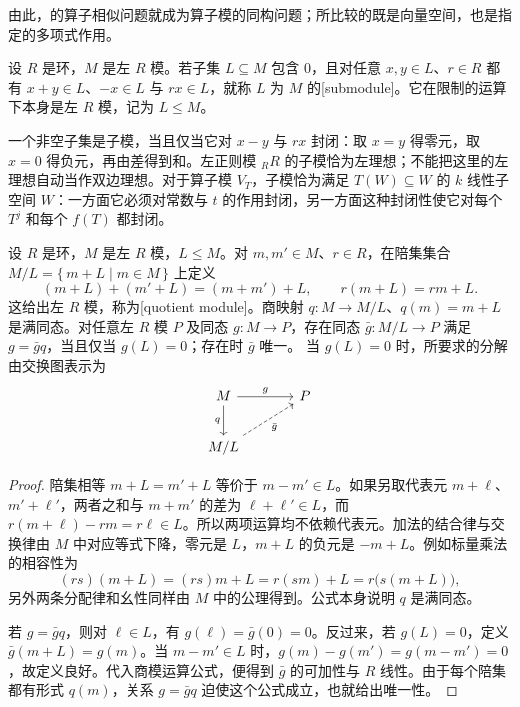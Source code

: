 由此，的算子相似问题就成为算子模的同构问题；所比较的既是向量空间，也是指定的多项式作用。

\begin{definition}\label{b2:def:submodule}
	设 \(R\) 是环，\(M\) 是左 \(R\) 模。若子集 \(L\subseteq M\) 包含 \(0\)，且对任意 \(x,y\in L\)、\(r\in R\) 都有 \(x+y\in L\)、\(-x\in L\) 与 \(rx\in L\)，就称 \(L\) 为 \(M\) 的[submodule]。它在限制的运算下本身是左 \(R\) 模，记为 \(L\le M\)。
\end{definition}

一个非空子集是子模，当且仅当它对 \(x-y\) 与 \(rx\) 封闭：取 \(x=y\) 得零元，取 \(x=0\) 得负元，再由差得到和。左正则模 \({}_RR\) 的子模恰为左理想；不能把这里的左理想自动当作双边理想。对于算子模 \(V_T\)，子模恰为满足 \(T(W)\subseteq W\) 的 \(k\) 线性子空间 \(W\)：一方面它必须对常数与 \(t\) 的作用封闭，另一方面这种封闭性使它对每个 \(T^j\) 和每个 \(f(T)\) 都封闭。

\begin{proposition}\label{b2:prop:quotient-module}
	设 \(R\) 是环，\(M\) 是左 \(R\) 模，\(L\le M\)。对 \(m,m'\in M\)、\(r\in R\)，在陪集集合 \(M/L=\{\,m+L\mid m\in M\,\}\) 上定义
	\[
		(m+L)+(m'+L)=(m+m')+L,\qquad r(m+L)=rm+L.
	\]
	这给出左 \(R\) 模，称为[quotient module]。商映射 \(q:M\to M/L\)、\(q(m)=m+L\) 是满同态。对任意左 \(R\) 模 \(P\) 及同态 \(g:M\to P\)，存在同态 \(\bar g:M/L\to P\) 满足 \(g=\bar gq\)，当且仅当 \(g(L)=0\)；存在时 \(\bar g\) 唯一。 当 \(g(L)=0\) 时，所要求的分解由交换图表示为
	\[
		\begin{tikzcd}[column sep=3.5em,row sep=2.2em]
			M\arrow[r,"g"]\arrow[d,"q"']&P\\
			M/L\arrow[ur,dashed,"\bar g"']&
		\end{tikzcd}
	\]
\end{proposition}
\begin{proof}
	陪集相等 \(m+L=m'+L\) 等价于 \(m-m'\in L\)。如果另取代表元 \(m+\ell\)、\(m'+\ell'\)，两者之和与 \(m+m'\) 的差为 \(\ell+\ell'\in L\)，而 \(r(m+\ell)-rm=r\ell\in L\)。所以两项运算均不依赖代表元。加法的结合律与交换律由 \(M\) 中对应等式下降，零元是 \(L\)，\(m+L\) 的负元是 \(-m+L\)。例如标量乘法的相容性为
	\[
		(rs)(m+L)=(rs)m+L=r(sm)+L=r\bigl(s(m+L)\bigr),
	\]
	另外两条分配律和幺性同样由 \(M\) 中的公理得到。公式本身说明 \(q\) 是满同态。

	若 \(g=\bar gq\)，则对 \(\ell\in L\)，有 \(g(\ell)=\bar g(0)=0\)。反过来，若 \(g(L)=0\)，定义 \(\bar g(m+L)=g(m)\)。当 \(m-m'\in L\) 时，\(g(m)-g(m')=g(m-m')=0\)，故定义良好。代入商模运算公式，便得到 \(\bar g\) 的可加性与 \(R\) 线性。由于每个陪集都有形式 \(q(m)\)，关系 \(g=\bar gq\) 迫使这个公式成立，也就给出唯一性。
\end{proof}

